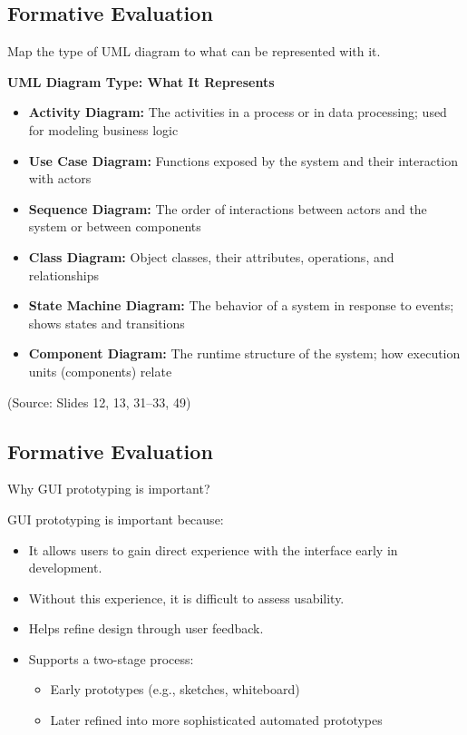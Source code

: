 \documentclass[12pt]{article}
\begin{document}
\subsection{Formative Evaluation}

\begin{questionbox}
Map the type of UML diagram to what can be represented with it.
\end{questionbox}

\textbf{UML Diagram Type: What It Represents}
\begin{itemize}
    \item \textbf{Activity Diagram:} The activities in a process or in data processing; used for modeling business logic
    \item \textbf{Use Case Diagram:} Functions exposed by the system and their interaction with actors
    \item \textbf{Sequence Diagram:} The order of interactions between actors and the system or between components
    \item \textbf{Class Diagram:} Object classes, their attributes, operations, and relationships
    \item \textbf{State Machine Diagram:} The behavior of a system in response to events; shows states and transitions
    \item \textbf{Component Diagram:} The runtime structure of the system; how execution units (components) relate
\end{itemize}

(Source: Slides 12, 13, 31--33, 49)

\subsection{Formative Evaluation}

\begin{questionbox}
Why GUI prototyping is important?
\end{questionbox}

GUI prototyping is important because:
\begin{itemize}
    \item It allows users to gain direct experience with the interface early in development.
    \item Without this experience, it is difficult to assess usability.
    \item Helps refine design through user feedback.
    \item Supports a two-stage process:
    \begin{itemize}
        \item Early prototypes (e.g., sketches, whiteboard)
        \item Later refined into more sophisticated automated prototypes
    \end{itemize}
\end{itemize}
\end{document}
